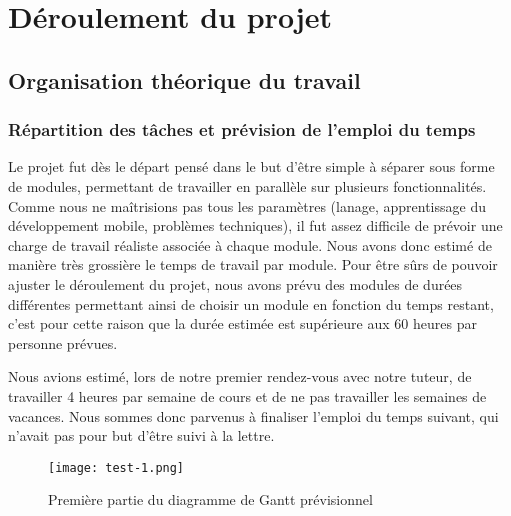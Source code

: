 \graphicspath{{Others/}}
\newpage
\section{Déroulement du projet}
\subsection{Organisation théorique du travail}
\subsubsection{Répartition des tâches et prévision de l'emploi du temps}
Le projet fut dès le départ pensé dans le but d'être simple à séparer sous forme de modules, permettant de travailler en parallèle sur plusieurs fonctionnalités.
Comme nous ne maîtrisions pas tous les paramètres (lanage, apprentissage du développement mobile, problèmes techniques), il fut assez difficile de prévoir une charge de travail réaliste associée à chaque module. Nous avons donc estimé 
de manière très grossière le temps de travail par module. Pour être sûrs de pouvoir ajuster le déroulement du projet, nous avons prévu des modules de durées différentes permettant ainsi
de choisir un module en fonction du temps restant, c'est pour cette raison que la durée estimée est supérieure aux 60 heures par personne prévues.
\par
Nous avions estimé, lors de notre premier rendez-vous avec notre tuteur, de travailler 4 heures par semaine de cours et de ne pas travailler les semaines de vacances.
Nous sommes donc parvenus à finaliser l'emploi du temps suivant, qui n'avait pas pour but d'être suivi à la lettre.
\vfill
\begin{figure}[!h]
    \begin{center}
        \texttt{[image: test-1.png]}
        \caption{Première partie du diagramme de Gantt prévisionnel}
    \end{center}
\end{figure}
